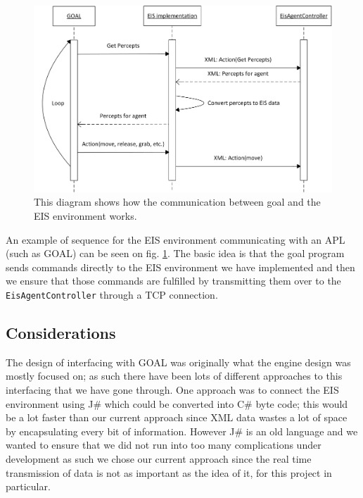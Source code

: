 \begin{figure}
\begin{centering}
\includegraphics[width=1\textwidth]{EISEnvironmentToGoalSequenceDiagram}
\par\end{centering}

\caption{This diagram shows how the communication between goal and the EIS
environment works.\label{fig:EISEnvironmentToGoalSequenceDiagram}}


\end{figure}


An example of sequence for the EIS environment communicating with
an APL (such as GOAL) can be seen on fig. \ref{fig:EISEnvironmentToGoalSequenceDiagram}.
The basic idea is that the goal program sends commands directly to
the EIS environment we have implemented and then we ensure that those
commands are fulfilled by transmitting them over to the \texttt{EisAgentController}
through a TCP connection.


\subsection*{Considerations}

The design of interfacing with GOAL was originally what the engine
design was mostly focused on; as such there have been lots of different
approaches to this interfacing that we have gone through. One approach
was to connect the EIS environment using J\# which could be converted
into C\# byte code; this would be a lot faster than our current approach
since XML data wastes a lot of space by encapsulating every bit of
information. However J\# is an old language and we wanted to ensure
that we did not run into too many complications under development
as such we chose our current approach since the real time transmission
of data is not as important as the idea of it, for this project in
particular. 


